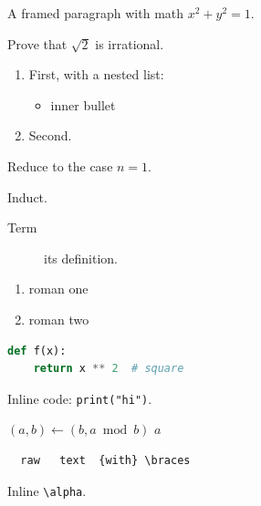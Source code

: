 \documentclass{amsart}
\begin{document}
\begin{mdframed}
  A framed paragraph with math $x^2 + y^2 = 1$.
\end{mdframed}
\begin{mdframed}[frametitle={Exercise}]
  Prove that $\sqrt{2}$ is irrational.
\end{mdframed}
\begin{enumerate}
  \item First, with a nested list:
  \begin{itemize}
    \item inner bullet
  \end{itemize}
  \item Second.
\end{enumerate}
\begin{steps}
  \item Reduce to the case $n = 1$.
  \item Induct.
\end{steps}
\begin{description}
  \item[Term] its definition.
\end{description}
\begin{enumerate}[label=(\roman*)]
  \item roman one
  \item roman two
\end{enumerate}
\begin{lstlisting}[language=Python]
def f(x):
    return x ** 2  # square
\end{lstlisting}
Inline code: \lstinline|print("hi")|.
\begin{algorithm}[H]
\caption{Euclid}
\begin{algorithmic}[1]
      \State $(a, b) \gets (b, a \bmod b)$
    \EndWhile
    \State \Return $a$
  \EndFunction
\end{algorithmic}
\end{algorithm}
\begin{verbatim}
  raw   text  {with} \braces
\end{verbatim}
Inline \verb|\alpha|.

\end{document}
